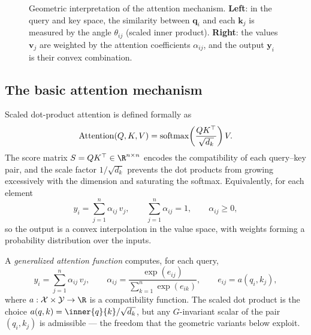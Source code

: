 \begin{figure}[h]
\caption[Geometric interpretation of attention]{Geometric interpretation of the
attention mechanism. \textbf{Left}: in the query and key space, the similarity
between $\mathbf{q}_i$ and each $\mathbf{k}_j$ is measured by the angle
$\theta_{ij}$ (scaled inner product). \textbf{Right}: the values
$\mathbf{v}_j$ are weighted by the attention coefficients $\alpha_{ij}$, and the
output $\mathbf{y}_i$ is their convex combination.}
\label{fig:apps:qkv}
\end{figure}

\subsection{The basic attention mechanism}
\label{subsec:apps:attn-basic}

Scaled dot-product attention is defined formally as
\[
  \operatorname{Attention}(Q, K, V) = \operatorname{softmax}\!\left(\frac{QK^\top}{\sqrt{d_k}}\right) V .
\]
The score matrix $S = QK^\top \in \R^{n\times n}$ encodes the compatibility of
each query--key pair, and the scale factor $1/\sqrt{d_k}$ prevents the dot
products from growing excessively with the dimension and saturating the softmax.
Equivalently, for each element
\[
  y_i = \sum_{j=1}^{n} \alpha_{ij}\, v_j,
  \qquad \sum_{j=1}^{n}\alpha_{ij} = 1, \qquad \alpha_{ij}\ge 0,
\]
so the output is a convex interpolation in the value space, with weights forming
a probability distribution over the inputs.

\begin{definition}
\label{def:apps:generalized-attn}
A \emph{generalized attention function} computes, for each query,
\[
  y_i = \sum_{j=1}^{n}\alpha_{ij}\, v_j,
  \qquad
  \alpha_{ij} = \frac{\exp(e_{ij})}{\sum_{k=1}^n \exp(e_{ik})},
  \qquad
  e_{ij} = a(q_i, k_j),
\]
where $a:\mathcal{X}\times\mathcal{Y}\to\R$ is a compatibility function. The
scaled dot product is the choice $a(q,k) = \inner{q}{k}/\sqrt{d_k}$, but any
$G$-invariant scalar of the pair $(q_i, k_j)$ is admissible --- the freedom that
the geometric variants below exploit.
\end{definition}

